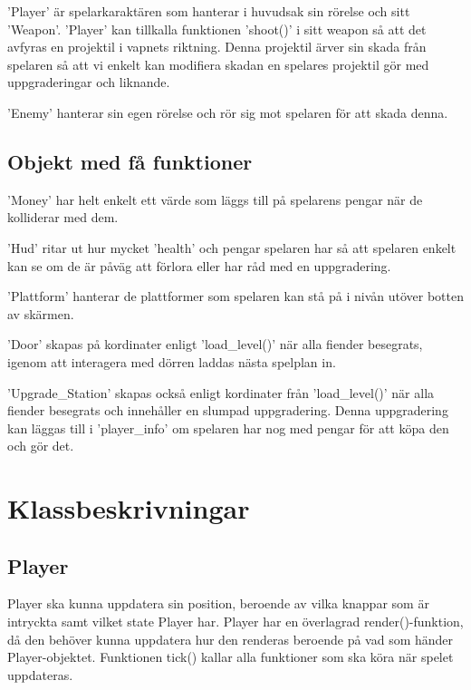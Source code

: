 \documentclass{TDP005mall}
\begin{document}
'Player' är spelarkaraktären som hanterar i huvudsak sin rörelse och sitt 'Weapon'. 'Player' kan tillkalla funktionen 'shoot()' i sitt weapon så att det avfyras en projektil i vapnets riktning. Denna projektil ärver sin skada från spelaren så att vi enkelt kan modifiera skadan en spelares projektil gör med uppgraderingar och liknande.

'Enemy' hanterar sin egen rörelse och rör sig mot spelaren för att skada denna.

\subsection{Objekt med få funktioner}
'Money' har helt enkelt ett värde som läggs till på spelarens pengar när de kolliderar med dem. 

'Hud' ritar ut hur mycket 'health' och pengar spelaren har så att spelaren enkelt kan se om de är påväg att förlora eller har råd med en uppgradering. 

'Plattform' hanterar de plattformer som spelaren kan stå på i nivån utöver botten av skärmen. 

'Door' skapas på kordinater enligt 'load\_level()' när alla fiender besegrats, igenom att interagera med dörren laddas nästa spelplan in. 

'Upgrade\_Station' skapas också enligt kordinater från 'load\_level()' när alla fiender besegrats och innehåller en slumpad uppgradering. Denna uppgradering kan läggas till i 'player\_info' om spelaren har nog med pengar för att köpa den och gör det.

\section{Klassbeskrivningar}
\subsection{Player}
Player ska kunna uppdatera sin position, beroende av vilka knappar som är intryckta samt vilket state Player har.
Player har en överlagrad render()-funktion, då den behöver kunna uppdatera hur den renderas beroende på vad som händer Player-objektet.
Funktionen tick() kallar alla funktioner som ska köra när spelet uppdateras. 
\end{document}
